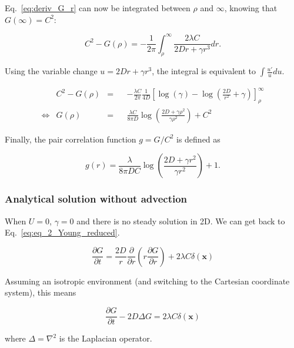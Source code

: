 Eq.~\ref{eq:deriv_G_r} can now be integrated between $\rho$ and $\infty$, knowing that $G(\infty)=C^{2}$:

\begin{equation}
 C^{2}-G(\rho) = -\frac{1}{2\pi}{\displaystyle \int_{\rho}^{\infty}}\frac{2\lambda C}{2Dr+\gamma r^{3}}dr.\label{eq:deriv_G_r_int1}
\end{equation}

Using the variable change $u=2Dr+\gamma r^{3}$, the integral is equivalent
to $\int\frac{u'}{u}du$.

\begin{align}
 & C^{2}-G(\rho) & = & & -\frac{\lambda C}{2\pi}\frac{1}{4D}\left[\log(\gamma)-\log\left(\frac{2D}{r^{2}}+\gamma\right)\right]_{\rho}^{\infty}\label{eq:deriv_G_rint2}\\
\Leftrightarrow & G(\rho) & = & & \frac{\lambda C}{8\pi D}\log\left(\frac{2D+\gamma \rho^{2}}{\gamma \rho^{2}}\right)+C^{2}\label{eq:G_rho}
\end{align}

Finally, the pair correlation function $g=G/C^{2}$ is defined as

\begin{equation}
g(r)=\frac{\lambda}{8\pi DC}\log\left(\frac{2D+\gamma r^{2}}{\gamma r^{2}}\right)+1.
\end{equation}

\subsubsection*{Analytical solution without advection}

When $U=0$, $\gamma=0$ and there is no steady solution in 2D. We can get
back to Eq.~\ref{eq:eq_2_Young_reduced}.

\begin{equation}
\frac{\partial G}{\partial t}=\frac{2D}{r}\frac{\partial}{\partial r}\left(r\frac{\partial G}{\partial r}\right)+2\lambda C\delta(\boldsymbol{x})\label{eq:g_without_advection}
\end{equation}

Assuming an isotropic environment (and switching to the Cartesian coordinate system), this means

\begin{equation}
\frac{\partial G}{\partial t}-2D\Delta G=2\lambda C\delta(\boldsymbol{x})
\end{equation}

where $\Delta=\nabla^{2}$ is the Laplacian operator. \\

